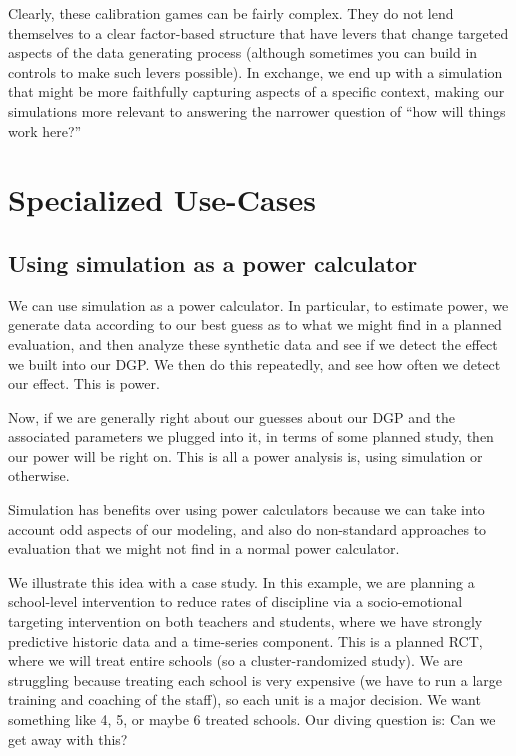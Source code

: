 \documentclass[
]{book}
\begin{document}
Clearly, these calibration games can be fairly complex.
They do not lend themselves to a clear factor-based structure that have levers that change targeted aspects of the data generating process (although sometimes you can build in controls to make such levers possible).
In exchange, we end up with a simulation that might be more faithfully capturing aspects of a specific context, making our simulations more relevant to answering the narrower question of ``how will things work here?''

\part{Specialized Use-Cases}\label{part-specialized-use-cases}

\chapter{Using simulation as a power calculator}\label{using-simulation-as-a-power-calculator}

We can use simulation as a power calculator.
In particular, to estimate power, we generate data according to our best guess as to what we might find in a planned evaluation, and then analyze these synthetic data and see if we detect the effect we built into our DGP.
We then do this repeatedly, and see how often we detect our effect.
This is power.

Now, if we are generally right about our guesses about our DGP and the associated parameters we plugged into it, in terms of some planned study, then our power will be right on.
This is all a power analysis is, using simulation or otherwise.

Simulation has benefits over using power calculators because we can take into account odd aspects of our modeling, and also do non-standard approaches to evaluation that we might not find in a normal power calculator.

We illustrate this idea with a case study.
In this example, we are planning a school-level intervention to reduce rates of discipline via a socio-emotional targeting intervention on both teachers and students, where we have strongly predictive historic data and a time-series component.
This is a planned RCT, where we will treat entire schools (so a cluster-randomized study).
We are struggling because treating each school is very expensive (we have to run a large training and coaching of the staff), so each unit is a major decision.
We want something like 4, 5, or maybe 6 treated schools.
Our diving question is: Can we get away with this?
\end{document}
